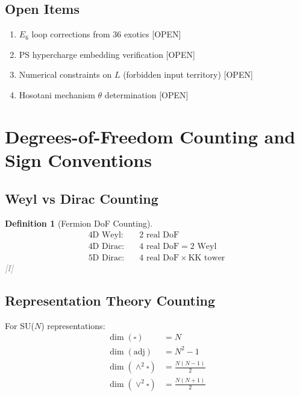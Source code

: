\documentclass[11pt,a4paper]{article}
\newtheorem{definition}[theorem]{Definition}
\newcommand{\tagI}{\textcolor{gray}{[I]}}
\newcommand{\tagOPEN}{\textcolor{red!70!black}{[OPEN]}}
\begin{document}
\subsection{Open Items}

\begin{enumerate}
    \item $E_6$ loop corrections from 36 exotics \tagOPEN
    \item PS hypercharge embedding verification \tagOPEN
    \item Numerical constraints on $L$ (forbidden input territory) \tagOPEN
    \item Hosotani mechanism $\theta$ determination \tagOPEN
\end{enumerate}

\appendix

\section{Degrees-of-Freedom Counting and Sign Conventions}
\label{app:dof}

\subsection{Weyl vs Dirac Counting}

\begin{definition}[Fermion DoF Counting]
\label{def:dof-counting}
\begin{align}
\label{eq:weyl-dof}
\text{4D Weyl:} \quad & 2 \text{ real DoF} \\
\label{eq:dirac-dof}
\text{4D Dirac:} \quad & 4 \text{ real DoF} = 2 \text{ Weyl} \\
\label{eq:5d-dirac-dof}
\text{5D Dirac:} \quad & 4 \text{ real DoF} \times \text{KK tower}
\end{align}
\tagI
\end{definition}

\subsection{Representation Theory Counting}

For SU($N$) representations:
\begin{align}
\label{eq:dim-fund}
\dim(\square) &= N \\
\label{eq:dim-adj}
\dim(\text{adj}) &= N^2 - 1 \\
\label{eq:dim-antisym}
\dim(\wedge^2 \square) &= \frac{N(N-1)}{2} \\
\label{eq:dim-sym}
\dim(\vee^2 \square) &= \frac{N(N+1)}{2}
\end{align}
\end{document}
